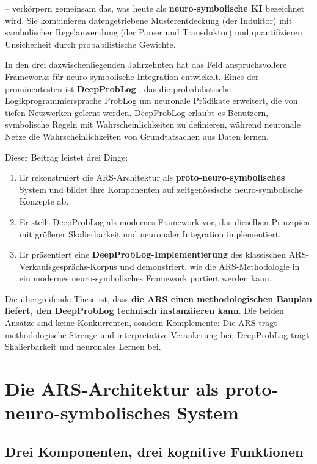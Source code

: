 \documentclass[12pt,a4paper]{article}
\begin{document}
– verkörpern gemeinsam das, was heute als \textbf{neuro-symbolische KI} bezeichnet 
wird. Sie kombinieren datengetriebene Musterentdeckung (der Induktor) mit 
symbolischer Regelanwendung (der Parser und Transduktor) und quantifizieren 
Unsicherheit durch probabilistische Gewichte.

In den drei dazwischenliegenden Jahrzehnten hat das Feld anspruchsvollere 
Frameworks für neuro-symbolische Integration entwickelt. Eines der prominentesten 
ist \textbf{DeepProbLog} \citep{manhaeve2018deepproblog}, das die probabilistische 
Logikprogrammiersprache ProbLog um neuronale Prädikate erweitert, die von 
tiefen Netzwerken gelernt werden. DeepProbLog erlaubt es Benutzern, symbolische 
Regeln mit Wahrscheinlichkeiten zu definieren, während neuronale Netze die 
Wahrscheinlichkeiten von Grundtatsachen aus Daten lernen.

Dieser Beitrag leistet drei Dinge:

\begin{enumerate}
    \item Er rekonstruiert die ARS-Architektur als \textbf{proto-neuro-symbolisches} 
    System und bildet ihre Komponenten auf zeitgenössische neuro-symbolische 
    Konzepte ab.
    
    \item Er stellt DeepProbLog als modernes Framework vor, das dieselben 
    Prinzipien mit größerer Skalierbarkeit und neuronaler Integration 
    implementiert.
    
    \item Er präsentiert eine \textbf{DeepProbLog-Implementierung} des 
    klassischen ARS-Verkaufsgesprächs-Korpus und demonstriert, wie die 
    ARS-Methodologie in ein modernes neuro-symbolisches Framework portiert 
    werden kann.
\end{enumerate}

Die übergreifende These ist, dass \textbf{die ARS einen methodologischen Bauplan 
liefert, den DeepProbLog technisch instanziieren kann}. Die beiden Ansätze sind 
keine Konkurrenten, sondern Komplemente: Die ARS trägt methodologische Strenge 
und interpretative Verankerung bei; DeepProbLog trägt Skalierbarkeit und 
neuronales Lernen bei.

\section{Die ARS-Architektur als proto-neuro-symbolisches System}

\subsection{Drei Komponenten, drei kognitive Funktionen}
\end{document}
